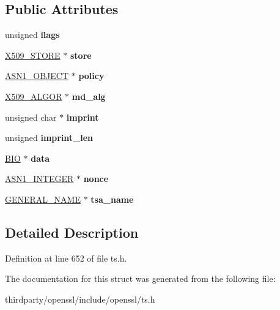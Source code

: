 \subsection*{Public Attributes}
\begin{DoxyCompactItemize}
\item 
\mbox{\label{struct_t_s__verify__ctx_a5e906cf22084ef30d67bdb15df294480}} 
unsigned {\bfseries flags}
\item 
\mbox{\label{struct_t_s__verify__ctx_a9aa523132a1fc3f0c6f5330b524e177f}} 
\hyperlink{structx509__store__st}{X509\+\_\+\+S\+T\+O\+RE} $\ast$ {\bfseries store}
\item 
\mbox{\label{struct_t_s__verify__ctx_ab433c7a76c0dd42e99eb654aa7c459fa}} 
\hyperlink{structasn1__object__st}{A\+S\+N1\+\_\+\+O\+B\+J\+E\+CT} $\ast$ {\bfseries policy}
\item 
\mbox{\label{struct_t_s__verify__ctx_a1875de1fef64a6d896f228badbdd2ddf}} 
\hyperlink{struct_x509__algor__st}{X509\+\_\+\+A\+L\+G\+OR} $\ast$ {\bfseries md\+\_\+alg}
\item 
\mbox{\label{struct_t_s__verify__ctx_a97e06ef1b0ab4490f7f50f06933c4187}} 
unsigned char $\ast$ {\bfseries imprint}
\item 
\mbox{\label{struct_t_s__verify__ctx_a4b7cf5f0d8930796aeac6966712612bb}} 
unsigned {\bfseries imprint\+\_\+len}
\item 
\mbox{\label{struct_t_s__verify__ctx_a093f5641e9235cf8523d18b550bee7f4}} 
\hyperlink{structbio__st}{B\+IO} $\ast$ {\bfseries data}
\item 
\mbox{\label{struct_t_s__verify__ctx_a3b3407367a1dd2b12053d527040b28a2}} 
\hyperlink{structasn1__string__st}{A\+S\+N1\+\_\+\+I\+N\+T\+E\+G\+ER} $\ast$ {\bfseries nonce}
\item 
\mbox{\label{struct_t_s__verify__ctx_aa41f4334c8821a67eca400e955957f57}} 
\hyperlink{struct_g_e_n_e_r_a_l___n_a_m_e__st}{G\+E\+N\+E\+R\+A\+L\+\_\+\+N\+A\+ME} $\ast$ {\bfseries tsa\+\_\+name}
\end{DoxyCompactItemize}


\subsection{Detailed Description}


Definition at line 652 of file ts.\+h.



The documentation for this struct was generated from the following file\+:\begin{DoxyCompactItemize}
\item 
thirdparty/openssl/include/openssl/ts.\+h\end{DoxyCompactItemize}
